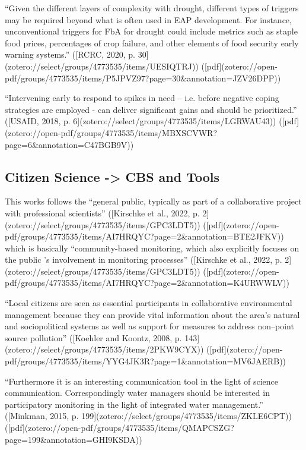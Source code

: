 “Given the different layers of complexity with drought, different types of triggers may be required beyond what is often used in EAP development. For instance, unconventional triggers for FbA for drought could include metrics such as staple food prices, percentages of crop failure, and other elements of food security early warning systems.” ([RCRC, 2020, p. 30](zotero://select/groups/4773535/items/UESIQTRJ)) ([pdf](zotero://open-pdf/groups/4773535/items/P5JPVZ97?page=30&annotation=JZV26DPP))

“Intervening early to respond to spikes in need – i.e. before negative coping strategies are employed - can deliver significant gains and should be prioritized.” ([USAID, 2018, p. 6](zotero://select/groups/4773535/items/LGRWAU43)) ([pdf](zotero://open-pdf/groups/4773535/items/MBXSCVWR?page=6&annotation=C47BGB9V))

\subsection{Citizen Science -> CBS and Tools}
This works follows the “general public, typically as part of a collaborative project with professional scientists” ([Kirschke et al., 2022, p. 2](zotero://select/groups/4773535/items/GPC3LDT5)) ([pdf](zotero://open-pdf/groups/4773535/items/AI7HRQYC?page=2&annotation=BTE2JFKV)) which is basically “community-based monitoring, which also explicitly focuses on the public ’s involvement in monitoring processes” ([Kirschke et al., 2022, p. 2](zotero://select/groups/4773535/items/GPC3LDT5)) ([pdf](zotero://open-pdf/groups/4773535/items/AI7HRQYC?page=2&annotation=K4URWWLV))

“Local citizens are seen as essential participants in collaborative environmental management because they can provide vital information about the area’s natural and sociopolitical systems as well as support for measures to address non–point source pollution” ([Koehler and Koontz, 2008, p. 143](zotero://select/groups/4773535/items/2PKW9CYX)) ([pdf](zotero://open-pdf/groups/4773535/items/YYG4JK3R?page=1&annotation=MV6JAERB))


“Furthermore it is an interesting communication tool in the light of science communication. Correspondingly water managers should be interested in participatory monitoring in the light of integrated water management.” ([Minkman, 2015, p. 199](zotero://select/groups/4773535/items/ZKLE6CPT)) ([pdf](zotero://open-pdf/groups/4773535/items/QMAPCSZG?page=199&annotation=GHI9KSDA))

